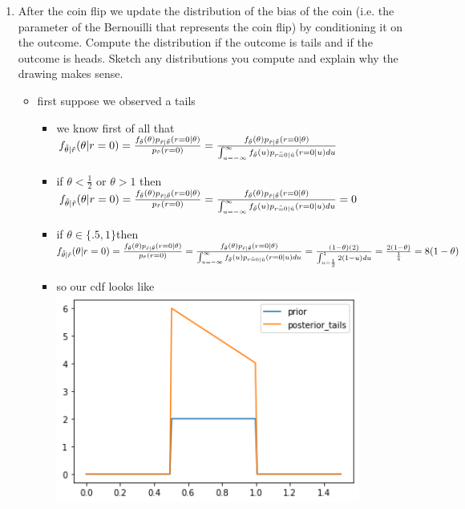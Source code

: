 \documentclass[12pt,twoside]{article}
\begin{document}
\begin{enumerate}
\begin{enumerate}
\begin{itemize}
\end{itemize}

\item After the coin flip we update the distribution of the bias of the coin (i.e. the parameter of the Bernouilli that represents the coin flip) by conditioning it on the outcome. Compute the distribution if the outcome is tails and if the outcome is heads. Sketch any distributions you compute and explain why the drawing makes sense.

\begin{itemize}
    \item first suppose we observed a tails
    \begin{itemize}
        \item we know first of all that $f_{\Tilde{\theta}|\Tilde{r}}(\theta|r=0)=\frac{f_{\Tilde{\theta}}(\theta)p_{\Tilde{r}|\Tilde{\theta}}(r=0|\theta)}{p_{\Tilde{r}}(r=0)}=\frac{f_{\Tilde{\theta}}(\theta)p_{\Tilde{r}|\Tilde{\theta}}(r=0|\theta)}{\int_{u=-\infty}^{\infty} f_{\Tilde{\theta}}(u)p_{\Tilde{r=0}|\Tilde{u}}(r=0|u)du}$
        \item if $\theta<\frac{1}{2}$ or  $\theta>1$ then  $f_{\Tilde{\theta}|\Tilde{r}}(\theta|r=0)=\frac{f_{\Tilde{\theta}}(\theta)p_{\Tilde{r}|\Tilde{\theta}}(r=0|\theta)}{p_{\Tilde{r}}(r=0)}=\frac{f_{\Tilde{\theta}}(\theta)p_{\Tilde{r}|\Tilde{\theta}}(r=0|\theta)}{\int_{u=-\infty}^{\infty} f_{\Tilde{\theta}}(u)p_{\Tilde{r=0}|\Tilde{u}}(r=0|u)du}=0$
        \item if $\theta \in \{.5,1\}$then  $f_{\Tilde{\theta}|\Tilde{r}}(\theta|r=0)=\frac{f_{\Tilde{\theta}}(\theta)p_{\Tilde{r}|\Tilde{\theta}}(r=0|\theta)}{p_{\Tilde{r}}(r=0)}=\frac{f_{\Tilde{\theta}}(\theta)p_{\Tilde{r}|\Tilde{\theta}}(r=0|\theta)}{\int_{u=-\infty}^{\infty} f_{\Tilde{\theta}}(u)p_{\Tilde{r=0}|\Tilde{u}}(r=0|u)du}=\frac{(1-\theta)(2)}{\int_{u=\frac{1}{2}}^{1}2(1-u)du}=\frac{2(1-\theta)}{\frac{1}{4}}=8(1-\theta)$
        \item so our cdf looks like \\\includegraphics[width=10cm]{homework 8/homework_8_question_1b_2.png}

\end{itemize}
\end{itemize}
\end{enumerate}
\end{enumerate}
\end{document}
